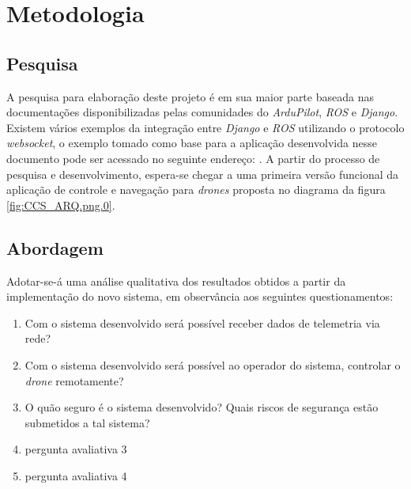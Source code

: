 \documentclass[12pt,a4paper,oneside]{book}
\begin{document}



\chapter{Metodologia}
\label{chapter:Metodologia}
%
\thispagestyle{empty} 
%
\section{Pesquisa}
%
A pesquisa para elaboração deste projeto é em sua maior parte baseada nas documentações disponibilizadas pelas comunidades do \textit{ArduPilot}, \textit{ROS} e \textit{Django}. Existem vários exemplos da integração entre \textit{Django} e \textit{ROS} utilizando o protocolo \textit{websocket}, o exemplo tomado como base para a aplicação desenvolvida nesse documento pode ser acessado no seguinte endereço: \cite{url:django_ros}.
%
A partir do processo de pesquisa e desenvolvimento, espera-se chegar a uma primeira versão funcional da aplicação de controle e navegação para \textit{drones} proposta no diagrama da figura \ref{fig:CCS_ARQ.png.0}.

\section{Abordagem}
Adotar-se-á uma análise qualitativa dos resultados obtidos a partir da implementação do novo sistema, em observância aos seguintes questionamentos:
\begin{enumerate}
    \item Com o sistema desenvolvido será possível receber dados de telemetria via rede?
    \item Com o sistema desenvolvido será possível ao operador do sistema, controlar o \textit{drone} remotamente?
    \item O quão seguro é o sistema desenvolvido? Quais riscos de segurança estão submetidos a tal sistema?
    \item pergunta avaliativa 3
    \item pergunta avaliativa 4
\end{enumerate}
%
%
\end{document}
